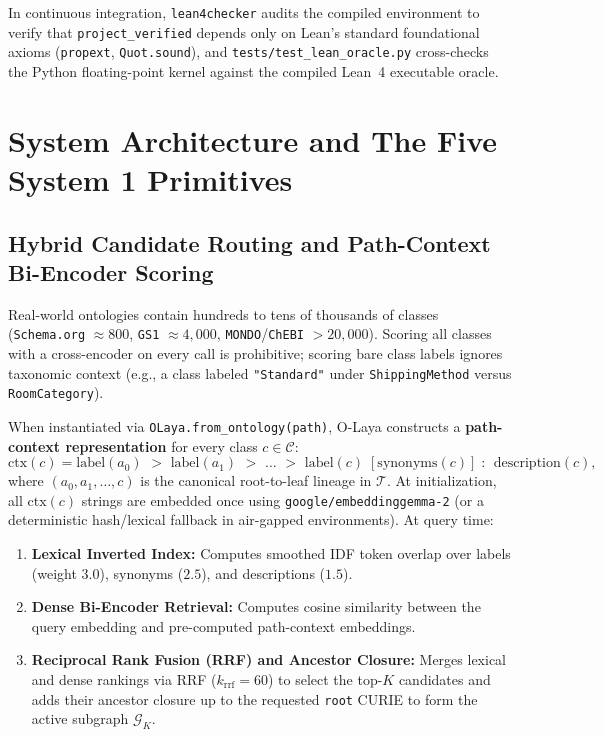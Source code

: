 \documentclass[11pt,a4paper]{article}
\begin{document}
In continuous integration, \texttt{lean4checker} audits the compiled environment to verify that \texttt{project\_verified} depends only on Lean's standard foundational axioms (\texttt{propext}, \texttt{Quot.sound}), and \texttt{tests/test\_lean\_oracle.py} cross-checks the Python floating-point kernel against the compiled Lean~4 executable oracle.

\section{System Architecture and The Five System 1 Primitives}
\label{sec:arch}

\subsection{Hybrid Candidate Routing and Path-Context Bi-Encoder Scoring}

Real-world ontologies contain hundreds to tens of thousands of classes (\texttt{Schema.org} $\approx 800$, \texttt{GS1} $\approx 4{,}000$, \texttt{MONDO}/\texttt{ChEBI} $> 20{,}000$). Scoring all classes with a cross-encoder on every call is prohibitive; scoring bare class labels ignores taxonomic context (e.g., a class labeled \texttt{"Standard"} under \texttt{ShippingMethod} versus \texttt{RoomCategory}).

When instantiated via \texttt{OLaya.from\_ontology(path)}, O-Laya constructs a \textbf{path-context representation} for every class $c \in \mathcal{C}$:
\begin{equation}
  \mathrm{ctx}(c) = \mathrm{label}(a_0) \;\texttt{ > }\; \mathrm{label}(a_1) \;\texttt{ > }\; \dots \;\texttt{ > }\; \mathrm{label}(c) \;[\mathrm{synonyms}(c)] \;\texttt{: }\; \mathrm{description}(c),
\end{equation}
where $(a_0, a_1, \dots, c)$ is the canonical root-to-leaf lineage in $\mathcal{T}$. At initialization, all $\mathrm{ctx}(c)$ strings are embedded once using \texttt{google/embeddinggemma-2} (or a deterministic hash/lexical fallback in air-gapped environments). At query time:
\begin{enumerate}[leftmargin=1.8em,itemsep=0.2em]
  \item \textbf{Lexical Inverted Index:} Computes smoothed IDF token overlap over labels (weight $3.0$), synonyms ($2.5$), and descriptions ($1.5$).
  \item \textbf{Dense Bi-Encoder Retrieval:} Computes cosine similarity between the query embedding and pre-computed path-context embeddings.
  \item \textbf{Reciprocal Rank Fusion (RRF) and Ancestor Closure:} Merges lexical and dense rankings via RRF ($k_{\mathrm{rrf}} = 60$) to select the top-$K$ candidates and adds their ancestor closure up to the requested \texttt{root} CURIE to form the active subgraph $\mathcal{G}_K$.
\end{enumerate}
\end{document}

